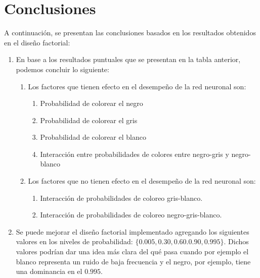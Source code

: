 \documentclass{article}
\begin{document}
 
    \section{Conclusiones}
    A continuación, se presentan las conclusiones basados en los resultados obtenidos en el diseño factorial:
    \begin{enumerate}
    	\item En base a los resultados puntuales que se presentan en la tabla anterior, podemos concluir lo siguiente:
    	\begin{enumerate}
    	\item Los factores que tienen efecto en el desempeño de la red neuronal son:
    		\begin{enumerate}
    			\item Probabilidad de colorear el negro
    			\item Probabilidad de colorear el gris
    			\item	Probabilidad de colorear el blanco
    			\item	Interacción entre probabilidades de colores entre negro-gris y negro-blanco
    			
			\end{enumerate}
			\item Los factores que no tienen efecto en el desempeño de la red neuronal son:
			\begin{enumerate}
				\item Interacción de probabilidades de coloreo gris-blanco.
				\item Interacción de probabilidades de coloreo negro-gris-blanco.
			\end{enumerate}
		\end{enumerate}
	\item Se puede mejorar el diseño factorial implementado agregando los siguientes valores en los niveles de probabilidad: $\{0.005,0.30, 0.60. 0.90,0.995\}$. Dichos valores podrían dar una idea más clara del qué pasa cuando por ejemplo el blanco representa un ruido de baja frecuencia y el negro, por ejemplo, tiene una dominancia en el $0.995$.
    \end{enumerate}


    
    
\end{document}
